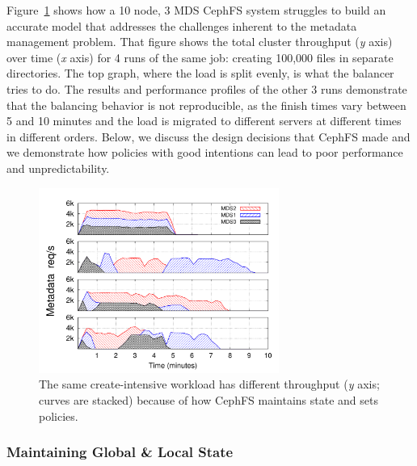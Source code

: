 Figure~\ref{figure:creates-thruput} shows how a 10 node, 3 MDS CephFS system struggles to build an accurate model that addresses the challenges inherent to the metadata management problem. That figure shows the total cluster throughput ({\it y} axis) over time ({\it x} axis) for 4 runs of the same job: creating 100,000 files in separate directories. The top graph, where the load is split evenly, is what the balancer tries to do. The results and performance profiles of the other 3 runs demonstrate that the balancing behavior is not reproducible, as the finish times vary between 5 and 10 minutes and the load is migrated to different servers at different times in different orders. Below, we discuss the design decisions that CephFS made and we demonstrate how policies with good intentions can lead to poor performance and unpredictability.

\begin{figure}[tb]
	\centering
	\includegraphics[width=0.7\textwidth]{./chapters/mantle/figures/creates-thruput-runs2.pdf}
	\caption{The same create-intensive workload has different throughput ({\it y} axis; curves are stacked) because of how CephFS maintains state and sets policies.\label{figure:creates-thruput}}
\end{figure}
\subsubsection{Maintaining Global \& Local State}
\label{the-challenge-in-maintaining_global_local_state}

